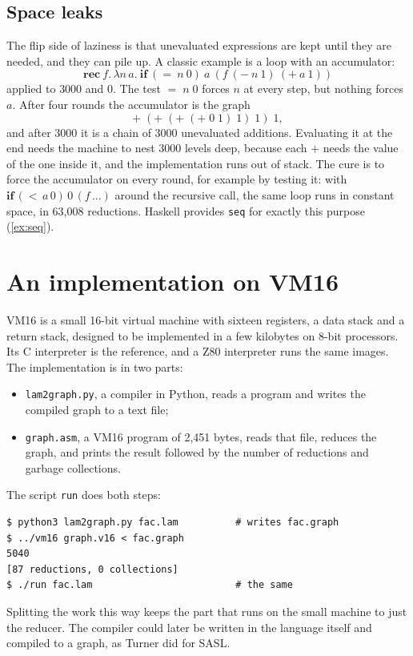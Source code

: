 \documentclass[11pt,a4paper]{article}
\theoremstyle{definition}
\theoremstyle{plain}
\begin{document}
\subsection{Space leaks}\label{sec:leaks}

The flip side of laziness is that unevaluated expressions are kept until
they are needed, and they can pile up. A classic example is a loop with an
accumulator:
\[
  \mathbf{rec}\ f.\,\lambda n\,a.\ \mathbf{if}\ ({=}\ n\ 0)\ a\ (f\ ({-}\ n\ 1)\ ({+}\ a\ 1))
\]
applied to $3000$ and $0$. The test ${=}\;n\;0$ forces $n$ at every step, but
nothing forces $a$. After four rounds the accumulator is the graph
\[
  {+}\;({+}\;({+}\;({+}\;0\;1)\;1)\;1)\;1,
\]
and after 3000 it is a chain of 3000 unevaluated additions. Evaluating it at
the end needs the machine to nest 3000 levels deep, because each ${+}$ needs
the value of the one inside it, and the implementation runs out of stack.
The cure is to force the accumulator on every round, for example by testing
it: with $\mathbf{if}\,({<}\,a\,0)\,0\,(f\,\ldots)$ around the recursive call,
the same loop runs in constant space, in 63,008 reductions. Haskell provides
\texttt{seq} for exactly this purpose (\cref{ex:seq}).

\section{An implementation on VM16}\label{sec:vm16}

VM16 is a small 16-bit virtual machine with sixteen registers, a data stack
and a return stack, designed to be implemented in a few kilobytes on 8-bit
processors. Its C interpreter is the reference, and a Z80 interpreter runs the
same images. The implementation is in two parts:
\begin{itemize}[itemsep=2pt]
\item \texttt{lam2graph.py}, a compiler in Python, reads a program and writes
  the compiled graph to a text file;
\item \texttt{graph.asm}, a VM16 program of 2,451 bytes, reads that file,
  reduces the graph, and prints the result followed by the number of
  reductions and garbage collections.
\end{itemize}
The script \texttt{run} does both steps:
\begin{lstlisting}[style=plain]
$ python3 lam2graph.py fac.lam          # writes fac.graph
$ ../vm16 graph.v16 < fac.graph
5040
[87 reductions, 0 collections]
$ ./run fac.lam                         # the same
\end{lstlisting}
Splitting the work this way keeps the part that runs on the small machine to
just the reducer. The compiler could later be written in the language itself
and compiled to a graph, as Turner did for SASL.
\end{document}
